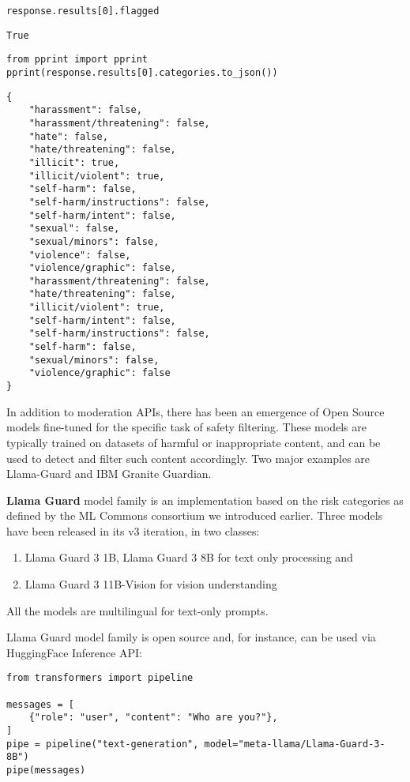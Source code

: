 \begin{verbatim}
response.results[0].flagged
\end{verbatim}

\begin{verbatim}
True
\end{verbatim}

\begin{verbatim}
from pprint import pprint
pprint(response.results[0].categories.to_json())
\end{verbatim}

\begin{verbatim}
{
    "harassment": false,
    "harassment/threatening": false,
    "hate": false,
    "hate/threatening": false,
    "illicit": true,
    "illicit/violent": true,
    "self-harm": false,
    "self-harm/instructions": false,
    "self-harm/intent": false,
    "sexual": false,
    "sexual/minors": false,
    "violence": false,
    "violence/graphic": false,
    "harassment/threatening": false,
    "hate/threatening": false,
    "illicit/violent": true,
    "self-harm/intent": false,
    "self-harm/instructions": false,
    "self-harm": false,
    "sexual/minors": false,
    "violence/graphic": false
}
\end{verbatim}


In addition to moderation APIs, there has been an emergence of Open Source models fine-tuned for the specific task of safety filtering. These models are typically trained on datasets of harmful or inappropriate content, and can be used to detect and filter such content accordingly. Two major examples are Llama-Guard and IBM Granite Guardian.

\textbf{Llama Guard} model family  is an implementation based on the risk categories as defined by the ML Commons consortium we introduced earlier. Three models have been released in its v3 iteration, in two classes:
\begin{enumerate}
    \item Llama Guard 3 1B, Llama Guard 3 8B for text only processing and
    \item Llama Guard 3 11B-Vision for vision understanding
\end{enumerate}

All the models are multilingual for text-only prompts.

Llama Guard model family is open source and, for instance, can be used via HuggingFace Inference API:

\begin{verbatim}
from transformers import pipeline

messages = [
    {"role": "user", "content": "Who are you?"},
]
pipe = pipeline("text-generation", model="meta-llama/Llama-Guard-3-8B")
pipe(messages)
\end{verbatim}

